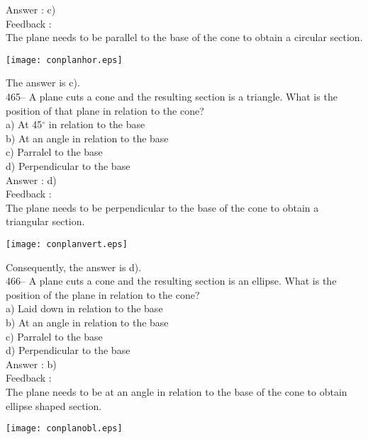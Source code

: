 \documentclass[letterpaper, 12pt]{article}
\begin{document}
Answer : c)\\

Feedback : \\
The plane needs to be parallel to the base of the cone to obtain a circular section.
    \begin{center}
    \texttt{[image: conplanhor.eps]}
    \end{center}

The answer is c).\\

465-- A plane cuts a cone and the resulting section is a triangle. What is the position of that plane in relation to the cone?\\
a) At 45$^{\circ}$ in relation to the base\\
b) At an angle in relation to the base\\
c) Parralel to the base\\
d) Perpendicular to the base\\

Answer : d)\\

Feedback : \\
The plane needs to be perpendicular to the base of the cone to obtain a triangular section.
    \begin{center}
    \texttt{[image: conplanvert.eps]}
    \end{center}

Consequently, the answer is d).\\


466-- A plane cuts a cone and the resulting section is an ellipse. What is the position of the plane in relation to the cone?\\
a) Laid down in relation to the base\\
b) At an angle in relation to the base\\
c) Parralel to the base\\
d) Perpendicular to the base\\

Answer : b)\\

Feedback : \\
The plane needs to be at an angle in relation to the base of the cone to obtain ellipse shaped section.
    \begin{center}
    \texttt{[image: conplanobl.eps]}
    \end{center}
\end{document}
